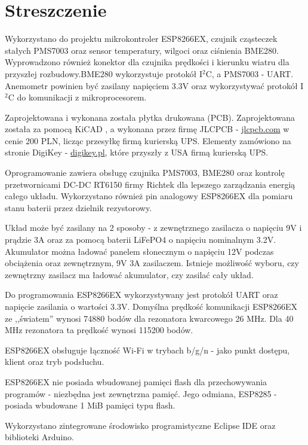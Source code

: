\documentclass[12pt,a4paper,oneside]{memoir}
\begin{document}
\chapter{Streszczenie} 
\par Wykorzystano do projektu mikrokontroler ESP8266EX, czujnik cząsteczek stałych PMS7003 oraz sensor temperatury, wilgoci oraz ciśnienia BME280. Wyprowadzono również konektor dla czujnika prędkości i kierunku wiatru dla przyszłej rozbudowy.BME280 wykorzystuje protokół I$^2$C, a PMS7003 - UART. Anemometr powinien być zasilany napięciem 3.3V oraz wykorzystywać protokół I$^2$C do komunikacji z mikroprocesorem.
\par Zaprojektowana i wykonana została płytka drukowana (PCB). Zaprojektowana została za pomocą KiCAD \cite{kicad}, a wykonana przez firmę JLCPCB - \url{jlcpcb.com} w cenie 200 PLN, licząc przesyłkę firmą kurierską UPS. Elementy zamówiono na stronie DigiKey - \url{digikey.pl}, które przyszły z USA firmą kurierską UPS.
\par Oprogramowanie zawiera obsługę czujnika PMS7003, BME280 oraz kontrolę przetwornicami DC-DC RT6150 firmy Richtek dla lepszego zarządzania energią całego układu.
Wykorzystano również pin analogowy ESP8266EX dla pomiaru stanu baterii przez dzielnik rezystorowy.
\par Układ może być zasilany na 2 sposoby - z zewnętrznego zasilacza o napięciu 9V i prądzie 3A oraz za pomocą baterii LiFePO4 o napięciu nominalnym 3.2V. Akumulator można ładować panelem słonecznym o napięciu 12V podczas obciążenia oraz zewnętrznym, 9V 3A zasilaczem. Istnieje możliwość wyboru, czy zewnętrzny zasilacz ma ładować akumulator, czy zasilać cały układ.
\par Do programowania ESP8266EX wykorzystywany jest protokół UART oraz napięcie zasilania o wartości 3.3V.
Domyślna prędkość komunikacji ESP8266EX ze ,,światem'' wynosi 74880 bodów dla rezonatora kwarcowego 26 MHz. Dla 40 MHz rezonatora ta prędkość wynosi 115200 bodów.
\par ESP8266EX obsługuje łączność Wi-Fi w trybach b/g/n - jako punkt dostępu, klient oraz tryb podsłuchu.
\par ESP8266EX nie posiada wbudowanej pamięci flash dla przechowywania programów - niezbędna jest zewnętrzna pamięć. Jego odmiana, ESP8285 - posiada wbudowane 1 MiB pamięci typu flash.
\par Wykorzystano zintegrowane środowisko programistyczne Eclipse IDE oraz biblioteki Arduino.
\newpage
\listoffigures
\newpage
\listoftables
\newpage
\end{document}

